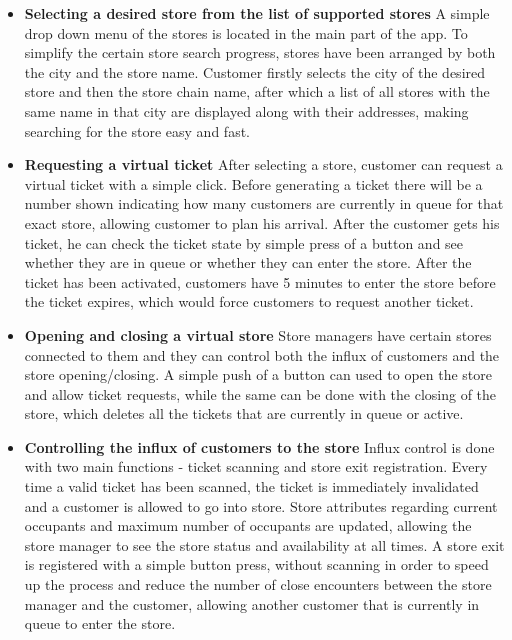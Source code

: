 \begin{itemize}
\item \textbf{Selecting a desired store from the list of supported stores} \newline
\hspace{\parindent} A simple drop down menu of the stores is located in the main part of the app. To simplify the certain store search progress, stores have been arranged by both the city and the store name. Customer firstly selects the city of the desired store and then the store chain name, after which a list of all stores with the same name in that city are displayed along with their addresses, making searching for the store easy and fast. 
\item \textbf{Requesting a virtual ticket} \newline
\hspace{\parindent} After selecting a store, customer can request a virtual ticket with a simple click. Before generating a ticket there will be a number shown indicating how many customers are currently in queue for that exact store, allowing customer to plan his arrival. After the customer gets his ticket, he can check the ticket state by simple press of a button and see whether they are in queue or whether they can enter the store. After the ticket has been activated, customers have 5 minutes to enter the store before the ticket expires, which would force customers to request another ticket.
\item \textbf{Opening and closing a virtual store} \newline
\hspace{\parindent} Store managers have certain stores connected to them and they can control both the influx of customers and the store opening/closing. A simple push of a button can used to open the store and allow ticket requests, while the same can be done with the closing of the store, which deletes all the tickets that are currently in queue or active.
\item \textbf{Controlling the influx of customers to the store} \newline
\hspace{\parindent} Influx control is done with two main functions - ticket scanning and store exit registration. Every time a valid ticket has been scanned, the ticket is immediately invalidated and a customer is allowed to go into store. Store attributes regarding current occupants and maximum number of occupants are updated, allowing the store manager to see the store status and availability at all times. 
A store exit is registered with a simple button press, without scanning in order to speed up the process and reduce the number of close encounters between the store manager and the customer, allowing another customer that is currently in queue to enter the store.


\end{itemize}
